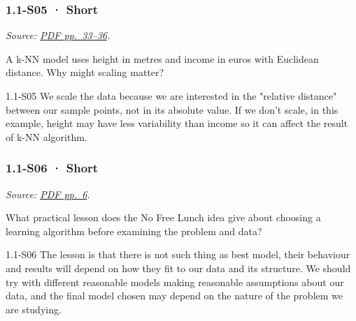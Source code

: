 \noindent\begin{minipage}{\linewidth}

\subsubsection{1.1-S05 · Short}\label{s05-short}

\emph{Source:
\href{../Lecture\%20Slides/1.1.\%20Fundamentals.pdf\#page=33}{PDF
pp.~33--36}.}

A k-NN model uses height in metres and income in euros with Euclidean
distance. Why might scaling matter?

\begin{solution}[20mm]{1.1-S05}
We scale the data because we are interested in the "relative distance" between our sample points, not in its absolute value. If we don't scale, in this example, height may have less variability than income so it can affect the result of k-NN algorithm.
\end{solution}
\end{minipage}\par\medskip

\noindent\begin{minipage}{\linewidth}

\subsubsection{1.1-S06 · Short}\label{s06-short}

\emph{Source:
\href{../Lecture\%20Slides/1.1.\%20Fundamentals.pdf\#page=6}{PDF
pp.~6}.}

What practical lesson does the No Free Lunch idea give about choosing a
learning algorithm before examining the problem and data?

\begin{solution}[20mm]{1.1-S06}
The lesson is that there is not such thing as best model, their behaviour and results will depend on how they fit to our data and its structure. We should try with different reasonable models making reasonable assumptions about our data, and the final model chosen may depend on the nature of the problem we are studying.
\end{solution}
\end{minipage}\par\medskip

